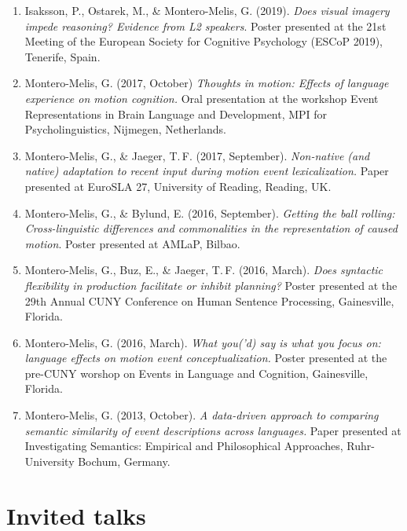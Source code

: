 \documentclass[margin, 11pt]{res} %
\begin{document}
\begin{resume}
\begin{enumerate}
\item Isaksson, P., Ostarek, M., \& Montero-Melis, G. (2019). \emph{Does visual imagery impede reasoning? Evidence from L2 speakers}. Poster presented at the 21st Meeting of the European Society for Cognitive Psychology (ESCoP 2019), Tenerife, Spain.

\item Montero-Melis, G. (2017, October) \emph{Thoughts in motion: Effects of language experience on motion cognition.} Oral presentation at the workshop Event Representations in Brain Language and Development, MPI for Psycholinguistics, Nijmegen, Netherlands.

\item Montero-Melis, G., \& Jaeger, T.\,F. (2017, September). \emph{Non-native (and native) adaptation to recent input during motion event lexicalization.} Paper presented at EuroSLA 27, University of Reading, Reading, UK.

\item Montero-Melis, G., \& Bylund, E. (2016, September). \emph{Getting the ball rolling: Cross-linguistic differences and commonalities in the representation of caused motion}. Poster presented at AMLaP, Bilbao.

\item Montero-Melis, G., Buz, E., \& Jaeger, T.\,F. (2016, March). \emph{Does syntactic flexibility in production facilitate or inhibit planning?} Poster presented at the 29th Annual CUNY Conference on Human Sentence Processing, Gainesville, Florida.

\item Montero-Melis, G. (2016, March). \emph{What you('d) say is what you focus on: language effects on motion event conceptualization.} Poster presented at the pre-CUNY worshop on Events in Language and Cognition, Gainesville, Florida.

\item Montero-Melis, G. (2013, October). \emph{A data-driven approach to comparing semantic similarity of event descriptions across languages.} Paper presented at Investigating Semantics: Empirical and Philosophical Approaches, Ruhr-University Bochum, Germany.

\end{enumerate}



\section{\sc Invited talks}


\end{resume}
\end{document}
